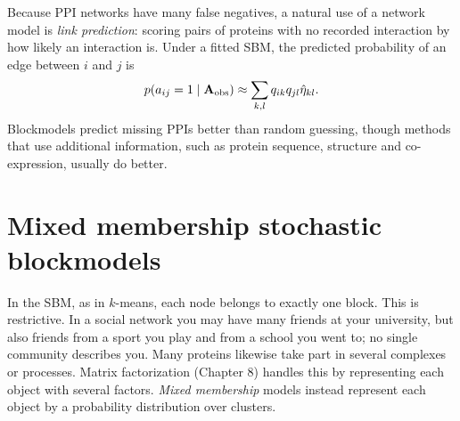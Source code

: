 Because PPI networks have many false negatives, a natural use of a network model is \emph{link prediction}: scoring pairs of proteins with no recorded interaction by how likely an interaction is. Under a fitted SBM, the predicted probability of an edge between $i$ and $j$ is
\begin{equation}
  p(a_{ij}=1\mid\mathbf{A}_{\text{obs}}) \approx \sum_{k,l}q_{ik}q_{jl}\hat\eta_{kl}.
\end{equation}
Blockmodels predict missing PPIs better than random guessing, though methods that use additional information, such as protein sequence, structure and co-expression, usually do better.

\section{Mixed membership stochastic blockmodels}
\label{sec:mmsb}

In the SBM, as in $k$-means, each node belongs to exactly one block. This is restrictive. In a social network you may have many friends at your university, but also friends from a sport you play and from a school you went to; no single community describes you. Many proteins likewise take part in several complexes or processes. Matrix factorization (Chapter 8) handles this by representing each object with several factors. \emph{Mixed membership} models instead represent each object by a probability distribution over clusters.

